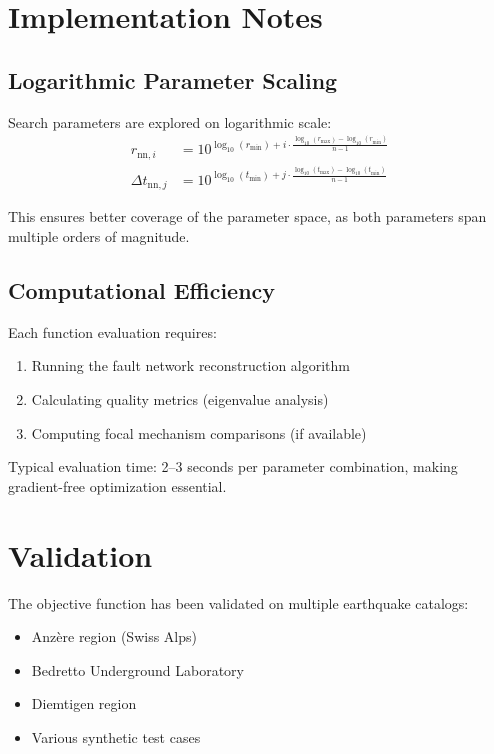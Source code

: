 \documentclass[11pt,a4paper]{article}
\begin{document}
\section{Implementation Notes}

\subsection{Logarithmic Parameter Scaling}

Search parameters are explored on logarithmic scale:
\begin{align}
r_{\text{nn},i} &= 10^{\log_{10}(r_{\min}) + i \cdot \frac{\log_{10}(r_{\max}) - \log_{10}(r_{\min})}{n-1}} \\
\Delta t_{\text{nn},j} &= 10^{\log_{10}(t_{\min}) + j \cdot \frac{\log_{10}(t_{\max}) - \log_{10}(t_{\min})}{n-1}}
\end{align}

This ensures better coverage of the parameter space, as both parameters span multiple orders of magnitude.

\subsection{Computational Efficiency}

Each function evaluation requires:
\begin{enumerate}
    \item Running the fault network reconstruction algorithm
    \item Calculating quality metrics (eigenvalue analysis)
    \item Computing focal mechanism comparisons (if available)
\end{enumerate}

Typical evaluation time: 2--3 seconds per parameter combination, making gradient-free optimization essential.

\section{Validation}

The objective function has been validated on multiple earthquake catalogs:
\begin{itemize}
    \item Anzère region (Swiss Alps)
    \item Bedretto Underground Laboratory
    \item Diemtigen region
    \item Various synthetic test cases
\end{itemize}
\end{document}
